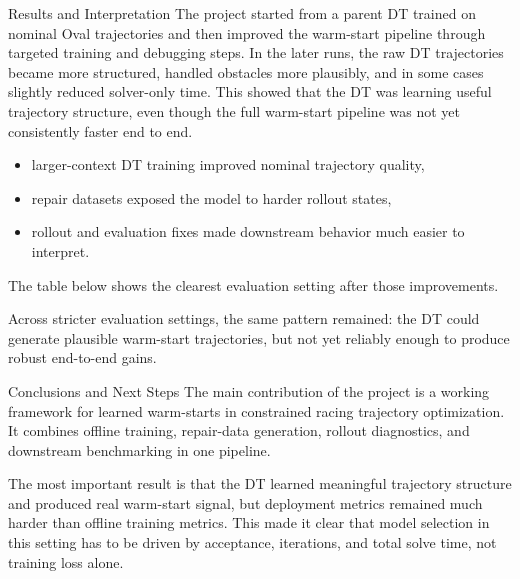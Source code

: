 \documentclass[final]{beamer}
\newlength{\colwidth}
\begin{document}
\begin{frame}[t]
\begin{columns}[t]
\begin{column}{\colwidth}
\begin{block}{Results and Interpretation}
The project started from a parent DT trained on nominal Oval trajectories and then improved the warm-start pipeline through targeted training and debugging steps. In the later runs, the raw DT trajectories became more structured, handled obstacles more plausibly, and in some cases slightly reduced solver-only time. This showed that the DT was learning useful trajectory structure, even though the full warm-start pipeline was not yet consistently faster end to end.
\begin{itemize}
\item larger-context DT training improved nominal trajectory quality,
\item repair datasets exposed the model to harder rollout states,
\item rollout and evaluation fixes made downstream behavior much easier to interpret.
\end{itemize}
The table below shows the clearest evaluation setting after those improvements.
\begin{center}
\footnotesize
\setlength{\tabcolsep}{5pt}
\end{center}

Across stricter evaluation settings, the same pattern remained: the DT could generate plausible warm-start trajectories, but not yet reliably enough to produce robust end-to-end gains.
\end{block}

\begin{block}{Conclusions and Next Steps}
The main contribution of the project is a working framework for learned warm-starts in constrained racing trajectory optimization. It combines offline training, repair-data generation, rollout diagnostics, and downstream benchmarking in one pipeline.

The most important result is that the DT learned meaningful trajectory structure and produced real warm-start signal, but deployment metrics remained much harder than offline training metrics. This made it clear that model selection in this setting has to be driven by acceptance, iterations, and total solve time, not training loss alone.


\end{block}
\end{column}
\end{columns}
\end{frame}
\end{document}
